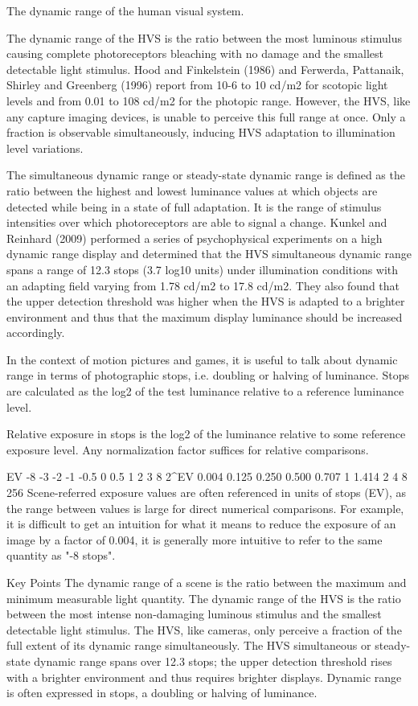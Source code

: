 The dynamic range of the human visual system.

The dynamic range of the HVS is the ratio between the most luminous stimulus causing complete photoreceptors bleaching with no damage and the smallest detectable light stimulus. Hood and Finkelstein (1986) and Ferwerda, Pattanaik, Shirley and Greenberg (1996) report from 10-6 to 10 cd/m2 for scotopic light levels and from 0.01 to 108 cd/m2 for the photopic range. However, the HVS, like any capture imaging devices, is unable to perceive this full range at once. Only a fraction is observable simultaneously, inducing HVS adaptation to illumination level variations.

The simultaneous dynamic range or steady-state dynamic range is defined as the ratio between the highest and lowest luminance values at which objects are detected while being in a state of full adaptation. It is the range of stimulus intensities over which photoreceptors are able to signal a change. Kunkel and Reinhard (2009) performed a series of psychophysical experiments on a high dynamic range display and determined that the HVS simultaneous dynamic range spans a range of 12.3 stops (3.7 log10 units) under illumination conditions with an adapting field varying from 1.78 cd/m2 to 17.8 cd/m2. They also found that the upper detection threshold was higher when the HVS is adapted to a brighter environment and thus that the maximum display luminance should be increased accordingly.

In the context of motion pictures and games, it is useful to talk about dynamic range in terms of photographic stops, i.e. doubling or halving of luminance. Stops are calculated as the log2 of the test luminance relative to a reference luminance level.

Relative exposure in stops is the log2 of the luminance relative to some reference exposure level. Any normalization factor suffices for relative comparisons.

EV
-8
-3
-2
-1
-0.5
0
0.5
1
2
3
8
2^EV
0.004
0.125
0.250
0.500
0.707
1
1.414
2
4
8
256
Scene-referred exposure values are often referenced in units of stops (EV), as the range between values is large for direct numerical comparisons. For example, it is difficult to get an intuition for what it means to reduce the exposure of an image by a factor of 0.004, it is generally more intuitive to refer to the same quantity as "-8 stops".

Key Points
The dynamic range of a scene is the ratio between the maximum and minimum measurable light quantity.
The dynamic range of the HVS is the ratio between the most intense non-damaging luminous stimulus and the smallest detectable light stimulus.
The HVS, like cameras, only perceive a fraction of the full extent of its dynamic range simultaneously.
The HVS simultaneous or steady-state dynamic range spans over 12.3 stops; the upper detection threshold rises with a brighter environment and thus requires brighter displays.
Dynamic range is often expressed in stops, a doubling or halving of luminance.

